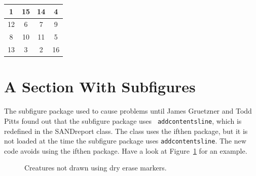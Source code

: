 \documentclass[pdf,ps2pdf,12pt]{smemo}
\begin{document}
\begin{memo}
\begin{table}[ht]
      \begin{tabular}{|c|c|c|c|}
        \hline
        1 & 15 & 14 & 4 \\ \hline
        12 & 6 & 7 & 9 \\ \hline
        8 & 10 & 11 & 5 \\ \hline
        13 & 3 & 2 & 16 \\ \hline
      \end{tabular}
      \label{tab2}
    \end{table}

    \section{A Section With Subfigures}
    The subfigure package used to cause problems until James Gruetzner and
    Todd Pitts found out that the subfigure package uses {\tt
      addcontentsline}, which is redefined in the SANDreport class. The
    class uses the ifthen package, but it is not loaded at the time the
    subfigure package uses {\tt addcontentsline}.  The new code avoids
    using the ifthen package.  Have a look at Figure~\ref{fig:creatures} 
    for an example.

    \begin{figure}[!btp]
      \centering
      \caption{Creatures not drawn using dry erase markers.}
      \label{fig:creatures}
    \end{figure}
    

\end{memo}
\end{document}
